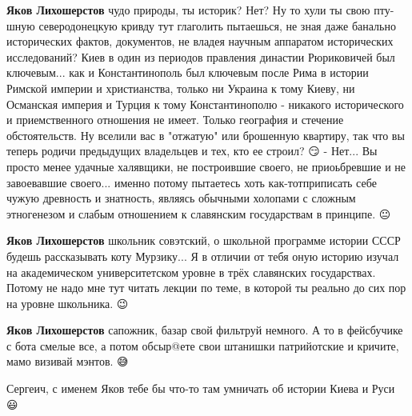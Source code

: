 \begin{itemize}
\begin{itemize}
\textbf{Яков Лихошерстов} чудо природы, ты историк? Нет? Ну то хули ты свою пту-шную северодонецкую кривду тут глаголить пытаешься, не зная даже банально исторических фактов, документов, не владея научным аппаратом исторических исследований? Киев в один из периодов правления династии Рюриковичей был ключевым... как и Константинополь был ключевым после Рима в истории Римской империи и христианства, только ни Украина к тому Киеву, ни Османская империя и Турция к тому Константинополю - никакого исторического и приемственного отношения не имеет. Только география и стечение обстоятельств. Ну вселили вас в "отжатую" или брошенную квартиру, так что вы теперь родичи предыдущих владельцев и тех, кто ее строил? 😏 - Нет... Вы просто менее удачные халявщики, не построившие своего, не приоьбревшие и не завоевавшие своего... именно потому пытаетесь хоть как-тотприписать себе чужую древность и знатность, являясь обычными холопами с сложным этногенезом и слабым отношением к славянским государствам в принципе. 😐

 
\textbf{Яков Лихошерстов} школьник совэтский, о школьной программе истории СССР будешь рассказывать коту Мурзику... Я в отличии от тебя оную историю изучал на академическом университетском уровне в трёх славянских государствах. Потому не надо мне тут читать лекции по теме, в которой ты реально до сих пор на уровне школьника. 😉

 
\textbf{Яков Лихошерстов} сапожник, базар свой фильтруй немного. А то в фейсбучике с бота смелые все, а потом обсыр@ете свои штанишки патрийотские и кричите, мамо визивай мэнтов. 😅

 
Сергеич, с именем Яков тебе бы что-то там умничать об истории Киева и Руси 😃

\end{itemize}


\end{itemize}
